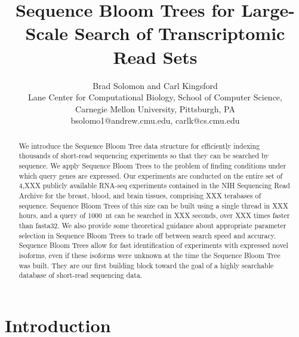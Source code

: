 \documentclass[11pt]{article}
\title{Sequence Bloom Trees for Large-Scale Search of Transcriptomic Read Sets}
\author{Brad Solomon and Carl Kingsford\\
Lane Center for Computational Biology, School of Computer Science,\\
Carnegie Mellon University, Pittsburgh, PA\\
bsolomo1@andrew.cmu.edu, carlk@cs.cmu.edu}
\date{}
\begin{document}
\maketitle
\begin{abstract}
We introduce the Sequence Bloom Tree data structure for efficiently indexing thousands of short-read sequencing experiments so that they can be searched by sequence. We apply Sequence Bloom Trees to the problem of finding conditions under which query genes are expressed. Our experiments are conducted on the entire set of 4,XXX publicly available RNA-seq experiments contained in the NIH Sequencing Read Archive for the breast, blood, and brain tissues, comprising XXX terabases of sequence. Sequence Bloom Trees of this size can be built using a single thread in XXX hours, and a query of 1000~nt can be searched in XXX seconds, over XXX times faster than fasta32. We also provide some theoretical guidance about appropriate parameter selection in Sequence Bloom Trees to trade off between search speed and accuracy. Sequence Bloom Trees allow for fast identification of experiments with expressed novel isoforms, even if these isoforms were unknown at the time the Sequence Bloom Tree was built. They are our first building block toward the goal of a highly searchable database of short-read sequencing data.
\end{abstract}

\section{Introduction}

\end{document}
